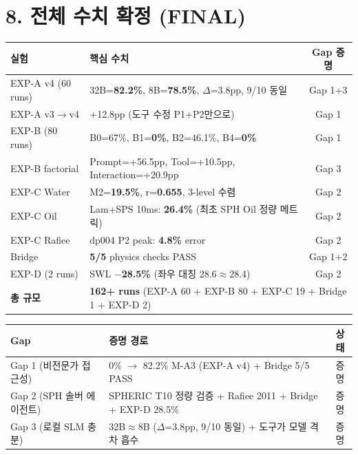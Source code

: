 \documentclass[10pt,a4paper]{article}
\begin{document}
\section{8. 전체 수치 확정 (FINAL)}

\begin{center}
\begin{tabular}{llc}
\toprule
\textbf{실험} & \textbf{핵심 수치} & \textbf{Gap 증명} \\
\midrule
EXP-A v4 (60 runs) & 32B=\textbf{82.2\%}, 8B=\textbf{78.5\%}, $\Delta$=3.8pp, 9/10 동일 & Gap 1+3 \\
EXP-A v3$\rightarrow$v4 & +12.8pp (도구 수정 P1+P2만으로) & Gap 1 \\
EXP-B (80 runs) & B0=67\%, B1=\textbf{0\%}, B2=46.1\%, B4=\textbf{0\%} & Gap 1 \\
EXP-B factorial & Prompt=+56.5pp, Tool=+10.5pp, Interaction=+20.9pp & Gap 3 \\
EXP-C Water & M2=\textbf{19.5\%}, r=\textbf{0.655}, 3-level 수렴 & Gap 2 \\
EXP-C Oil & Lam+SPS 10ms: \textbf{26.4\%} (최초 SPH Oil 정량 메트릭) & Gap 2 \\
EXP-C Rafiee & dp004 P2 peak: \textbf{4.8\%} error & Gap 2 \\
Bridge & \textbf{5/5} physics checks PASS & Gap 1+2 \\
EXP-D (2 runs) & SWL \textbf{$-$28.5\%} (좌우 대칭 28.6$\approx$28.4) & Gap 2 \\
\midrule
\textbf{총 규모} & \multicolumn{2}{l}{\textbf{162+ runs} (EXP-A 60 + EXP-B 80 + EXP-C 19 + Bridge 1 + EXP-D 2)} \\
\bottomrule
\end{tabular}
\end{center}

\begin{center}
\small
\begin{tabular}{lp{9cm}c}
\toprule
\textbf{Gap} & \textbf{증명 경로} & \textbf{상태} \\
\midrule
Gap 1 (비전문가 접근성) & 0\% $\rightarrow$ 82.2\% M-A3 (EXP-A v4) + Bridge 5/5 PASS & \textcolor{pass}{증명} \\
Gap 2 (SPH 솔버 에이전트) & SPHERIC T10 정량 검증 + Rafiee 2011 + Bridge + EXP-D 28.5\% & \textcolor{pass}{증명} \\
Gap 3 (로컬 SLM 충분) & 32B$\approx$8B ($\Delta$=3.8pp, 9/10 동일) + 도구가 모델 격차 흡수 & \textcolor{pass}{증명} \\
\bottomrule
\end{tabular}
\end{center}
\end{document}
